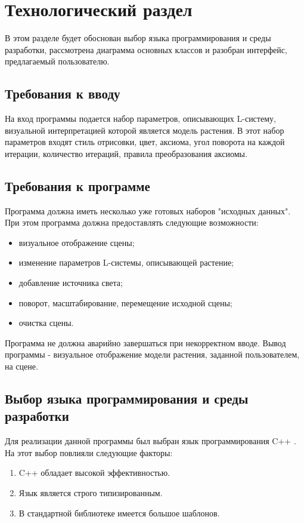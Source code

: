 \chapter{Технологический раздел}
В этом разделе будет обоснован выбор языка программирования и среды разработки, рассмотрена диаграмма основных классов и разобран интерфейс, предлагаемый пользователю.

\section{Требования к вводу} 
На вход программы подается набор параметров, описывающих L-систему, визуальной интерпретацией которой является модель растения. В этот набор параметров входят стиль отрисовки, цвет, аксиома, угол поворота на каждой итерации, количество итераций, правила преобразования аксиомы.

\section{Требования к программе} 
Программа должна иметь несколько уже готовых наборов "исходных данных". При этом программа должна предоставлять следующие возможности:
\begin{itemize}
	\item визуальное отображение сцены;
	\item изменение параметров L-системы, описывающей растение;
        \item добавление источника света;
	\item поворот, масштабирование, перемещение исходной сцены;
        \item очистка сцены.
\end{itemize}

Программа не должна аварийно завершаться при некорректном вводе.
Вывод программы - визуальное отображение модели растения, заданной пользователем, на сцене.

\section{Выбор языка программирования и среды разработки}
Для реализации данной программы был выбран язык программирования C++ \cite{Cpp}. На этот выбор повлияли следующие факторы:

\begin{enumerate} 
        \item C++ обладает высокой эффективностью.
	\item Язык является строго типизированным.
	\item В стандартной библиотеке имеется большое шаблонов.
\end{enumerate}

